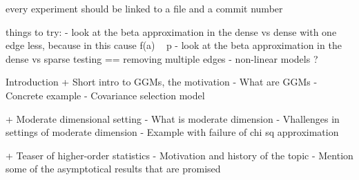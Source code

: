




every experiment should be linked to a file and a commit number

things to try:
    - look at the beta approximation in the dense vs dense with one edge less, because in this cause f(a) ~ p
    - look at the beta approximation in the dense vs sparse testing == removing multiple edges
    - non-linear models ?





Introduction
    + Short intro to GGMs, the motivation
        - What are GGMs
        - Concrete example
        - Covariance selection model
    
    + Moderate dimensional setting
        - What is moderate dimension
        - Vhallenges in settings of moderate dimension
        - Example with failure of chi sq approximation

    + Teaser of higher-order statistics
        - Motivation and history of the topic
        - Mention some of the asymptotical results that are promised

